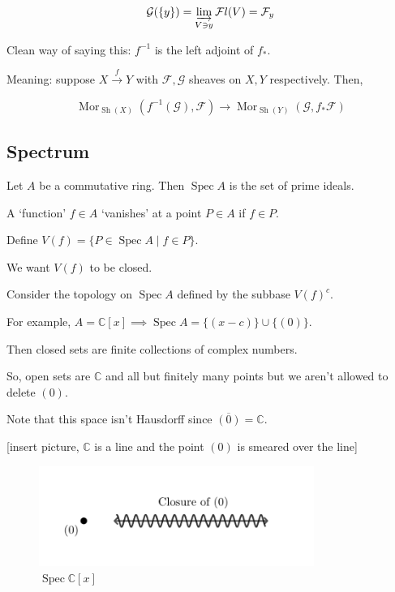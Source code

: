 \documentclass{article}
\theoremstyle{definition}
\begin{document}
    \[
        \mathcal{G}(\{ y \}) = \varinjlim_{V\ni y} \mathcal{F} l(V) = \mathcal{F}_y
    \]

    Clean way of saying this: \(f ^{-1}\) is the left adjoint of \(f_{\ast}\).

    Meaning: suppose \(X \xrightarrow{f} Y\) with \(\mathcal{F}, \mathcal{G}\) sheaves on \(X,Y\) respectively. Then,

    \[
        \operatorname{Mor}_{\operatorname{Sh} (X)} ( f ^{-1} (\mathcal{G}), \mathcal{F}) \to \operatorname{Mor}_{\operatorname{Sh} (Y)} (\mathcal{G}, f_{\ast} \mathcal{F})
    \]

    \subsection*{Spectrum}

    Let \(A\) be a commutative ring. Then \(\operatorname{Spec} A\) is the set of prime ideals.

    A `function' \(f \in A\) `vanishes' at a point \(P \in A\) if \(f \in P\).

    Define \(V(f) = \{ P \in \operatorname{Spec} A \mid f\in P \}\).

    We want \(V(f)\) to be closed.

    Consider the topology on \(\operatorname{Spec} A\) defined by the subbase \(V(f) ^{c} \).

    For example, \(A = \mathbb{C} [x] \implies \operatorname{Spec} A = \{ (x-c) \} \cup \{ (0) \}\).

    Then closed sets are finite collections of complex numbers.

    So, open sets are \(\mathbb{C}\) and all but finitely many points but we aren't allowed to delete \((0)\).

    Note that this space isn't Hausdorff since \(\overline{(0)} = \mathbb{C}\).

    [insert picture, \(\mathbb{C}\) is a line and the point \((0)\) is smeared over the line]
    \begin{figure}[H]
        \centering
        \includegraphics[width=0.8\textwidth]{img/SpecCx}
        \caption{$\operatorname{Spec}\mathbb{C}[x]$}
    \end{figure}
\end{document}
